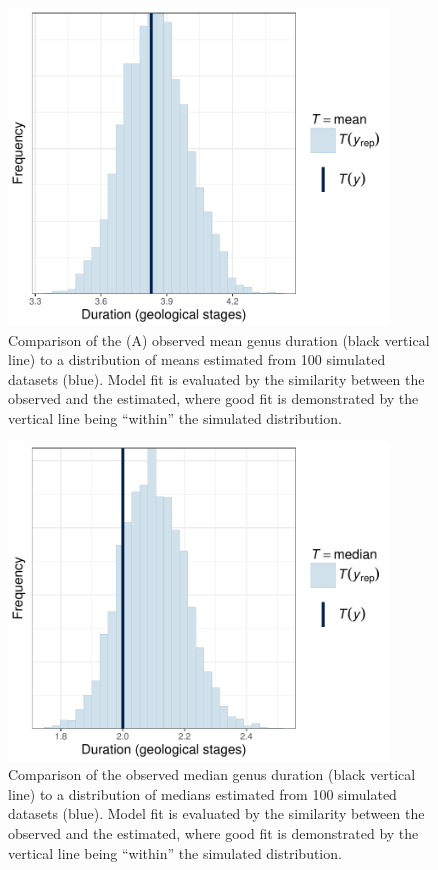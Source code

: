 \documentclass[11pt]{article}
\begin{document}
\begin{figure}[ht]
  \centering
  \includegraphics[height = 0.5\textheight,width=0.9\textwidth,keepaspectratio=true]{figure/ppc_mean_cweib_cens}
  \caption{Comparison of the (A) observed mean genus duration (black vertical line) to a distribution of means estimated from 100 simulated datasets (blue). Model fit is evaluated by the similarity between the observed and the estimated, where good fit is demonstrated by the vertical line being ``within'' the simulated distribution.}
  \label{fig:ppc_mean}
\end{figure}

\begin{figure}[ht]
  \centering
  \includegraphics[height = 0.5\textheight,width=0.9\textwidth,keepaspectratio=true]{figure/ppc_median_cweib_cens}
  \caption{Comparison of the observed median genus duration (black vertical line) to a distribution of medians estimated from 100 simulated datasets (blue). Model fit is evaluated by the similarity between the observed and the estimated, where good fit is demonstrated by the vertical line being ``within'' the simulated distribution. }
  \label{fig:ppc_median}
\end{figure}
\end{document}
